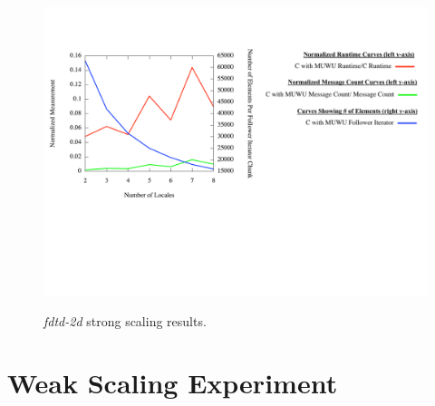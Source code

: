 \begin{figure}
\begin{center}
\includegraphics[width=\linewidth]{./Figures/strong_scaling/fdtd2d.pdf}
\renewcommand{\baselinestretch}{1}
\small\normalsize
\begin{quote}
\caption[\textit{fdtd-2d} strong scaling results]{\textit{fdtd-2d} strong scaling results.\label{fdtd-2d_strong_scaling}}
\end{quote}
\end{center}
\end{figure}

\section{Weak Scaling Experiment}\label{sec:input_variation}

